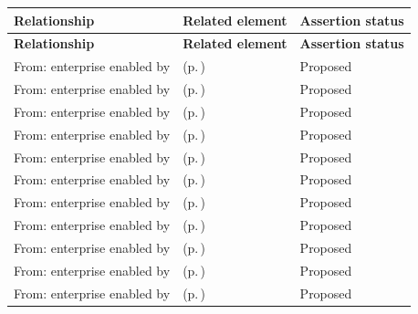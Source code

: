 \begingroup\small\setlength{\TableWidth}{\dimexpr\linewidth-6\tabcolsep-4\arrayrulewidth\relax}
\begin{longtable}{|>{\raggedright\arraybackslash}p{0.27\TableWidth}|>{\raggedright\arraybackslash}p{0.48\TableWidth}|>{\raggedright\arraybackslash}p{0.25\TableWidth}|}
\hline\rowcolor{TableHead}\textbf{Relationship} & \textbf{Related element} & \textbf{Assertion status}\\\hline\endfirsthead
\hline\rowcolor{TableHead}\textbf{Relationship} & \textbf{Related element} & \textbf{Assertion status}\\\hline\endhead
\hline\endfoot
From: enterprise enabled by & \nameref{cap:bec-person-identity} (p.\,\pageref{cap:bec-person-identity}) & Proposed\\\hline
From: enterprise enabled by & \nameref{cap:bec-healthcare-subject} (p.\,\pageref{cap:bec-healthcare-subject}) & Proposed\\\hline
From: enterprise enabled by & \nameref{cap:bec-provider-administration} (p.\,\pageref{cap:bec-provider-administration}) & Proposed\\\hline
From: enterprise enabled by & \nameref{cap:bec-organisation-administration} (p.\,\pageref{cap:bec-organisation-administration}) & Proposed\\\hline
From: enterprise enabled by & \nameref{cap:bec-location-administration} (p.\,\pageref{cap:bec-location-administration}) & Proposed\\\hline
From: enterprise enabled by & \nameref{cap:bec-health-service-administration} (p.\,\pageref{cap:bec-health-service-administration}) & Proposed\\\hline
From: enterprise enabled by & \nameref{cap:bec-clinical-device-administration} (p.\,\pageref{cap:bec-clinical-device-administration}) & Proposed\\\hline
From: enterprise enabled by & \nameref{cap:bec-client-privacy} (p.\,\pageref{cap:bec-client-privacy}) & Proposed\\\hline
From: enterprise enabled by & \nameref{cap:bec-health-information-control} (p.\,\pageref{cap:bec-health-information-control}) & Proposed\\\hline
From: enterprise enabled by & \nameref{cap:bec-clinical-record-administration} (p.\,\pageref{cap:bec-clinical-record-administration}) & Proposed\\\hline
From: enterprise enabled by & \nameref{cap:bec-patient-clinical-record} (p.\,\pageref{cap:bec-patient-clinical-record}) & Proposed\\\hline

\end{longtable}
